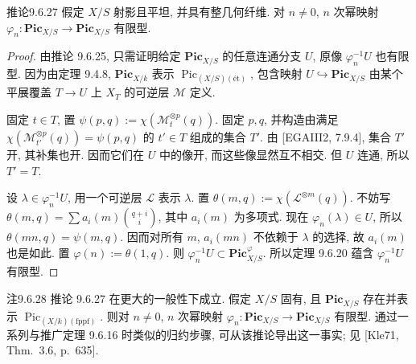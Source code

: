 \begin{origstatement}{推论}{9.6.27}\label{ch09s6:cor9627}
假定 $X/S$ 射影且平坦, 并具有整几何纤维. 对 $n\ne0$, $n$ 次幂映射 $\varphi_n:\mathbf{Pic}_{X/S}\to\mathbf{Pic}_{X/S}$ 有限型.
\end{origstatement}
\begin{proof}
由推论 9.6.25, 只需证明给定 $\mathbf{Pic}_{X/S}$ 的任意连通分支 $U$, 原像 $\varphi_n^{-1}U$ 也有限型. 因为由定理 9.4.8, $\mathbf{Pic}_{X/k}$ 表示 $\operatorname{Pic}_{(X/S)(\text{ét})}$, 包含映射 $U\hookrightarrow\mathbf{Pic}_{X/S}$ 由某个平展覆盖 $T\to U$ 上 $X_T$ 的可逆层 $\mathcal M$ 定义.

固定 $t\in T$, 置 $\psi(p,q):=\chi(\mathcal M_t^{\otimes p}(q))$. 固定 $p,q$, 并构造由满足 $\chi(\mathcal M_{t'}^{\otimes p}(q))=\psi(p,q)$ 的 $t'\in T$ 组成的集合 $T'$. 由 [EGAIII2, 7.9.4], 集合 $T'$ 开, 其补集也开. 因而它们在 $U$ 中的像开, 而这些像显然互不相交. 但 $U$ 连通, 所以 $T'=T$.

设 $\lambda\in\varphi_n^{-1}U$, 用一个可逆层 $\mathcal L$ 表示 $\lambda$. 置 $\theta(m,q):=\chi(\mathcal L^{\otimes m}(q))$. 不妨写 $\theta(m,q)=\sum a_i(m)\binom{q+i}{i}$, 其中 $a_i(m)$ 为多项式. 现在 $\varphi_n(\lambda)\in U$, 所以 $\theta(mn,q)=\psi(m,q)$. 因而对所有 $m$, $a_i(mn)$ 不依赖于 $\lambda$ 的选择, 故 $a_i(m)$ 也是如此. 置 $\varphi(n):=\theta(1,q)$. 则 $\varphi_n^{-1}U\subset\mathbf{Pic}_{X/S}^{\varphi}$. 所以定理 9.6.20 蕴含 $\varphi_n^{-1}U$ 有限型.
\end{proof}

\begin{origstatement}{注}{9.6.28}\label{ch09s6:rem9628}
推论 9.6.27 在更大的一般性下成立. 假定 $X/S$ 固有, 且 $\mathbf{Pic}_{X/S}$ 存在并表示 $\operatorname{Pic}_{(X/k)(\mathrm{fppf})}$. 则对 $n\ne0$, $n$ 次幂映射 $\varphi_n:\mathbf{Pic}_{X/S}\to\mathbf{Pic}_{X/S}$ 有限型. 通过一系列与推广定理 9.6.16 时类似的归约步骤, 可从该推论导出这一事实; 见 [Kle71, Thm.~3.6, p.~635].
\end{origstatement}

